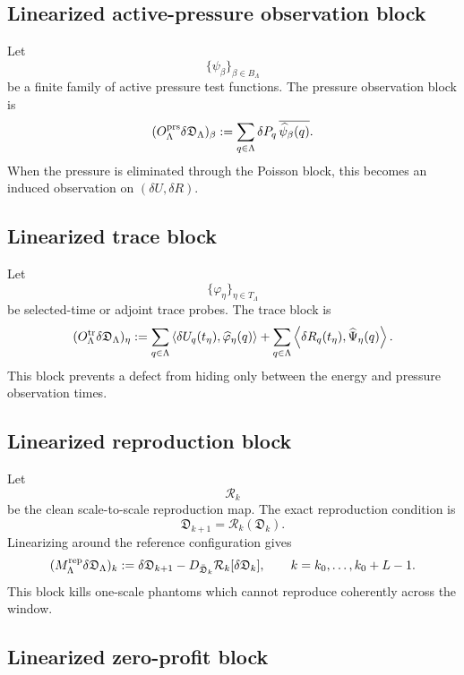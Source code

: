 \documentclass[11pt]{article}
\numberwithin{equation}{section}
\begin{document}
\subsection{Linearized active-pressure observation block}

Let
\[
        \{\psi_\beta\}_{\beta\in B_\Lambda}
\]
be a finite family of active pressure test functions.  The pressure
observation block is
\[
        (O_\Lambda^{\rm prs}\delta\mathfrak D_\Lambda)_\beta
        :=
        \sum_{q\in\Lambda}
        \delta P_q\,\overline{\widehat\psi_\beta(q)}.
\]
When the pressure is eliminated through the Poisson block, this becomes an
induced observation on \((\delta U,\delta R)\).

\subsection{Linearized trace block}

Let
\[
        \{\varphi_\eta\}_{\eta\in T_\Lambda}
\]
be selected-time or adjoint trace probes.  The trace block is
\[
        (O_\Lambda^{\rm tr}\delta\mathfrak D_\Lambda)_\eta
        :=
        \sum_{q\in\Lambda}
        \left\langle
        \delta U_q(t_\eta),
        \widehat\varphi_\eta(q)
        \right\rangle
        +
        \sum_{q\in\Lambda}
        \left\langle
        \delta R_q(t_\eta),
        \widehat\Psi_\eta(q)
        \right\rangle .
\]
This block prevents a defect from hiding only between the energy and
pressure observation times.

\subsection{Linearized reproduction block}

Let
\[
        \mathcal R_k
\]
be the clean scale-to-scale reproduction map.  The exact reproduction
condition is
\[
        \mathfrak D_{k+1}=\mathcal R_k(\mathfrak D_k).
\]
Linearizing around the reference configuration gives
\[
        (M_\Lambda^{\rm rep}\delta\mathfrak D_\Lambda)_k
        :=
        \delta\mathfrak D_{k+1}
        -
        D_{\bar{\mathfrak D}_k}\mathcal R_k
        [\delta\mathfrak D_k],
        \qquad k=k_0,\ldots,k_0+L-1.
\]
This block kills one-scale phantoms which cannot reproduce coherently
across the window.

\subsection{Linearized zero-profit block}
\end{document}
